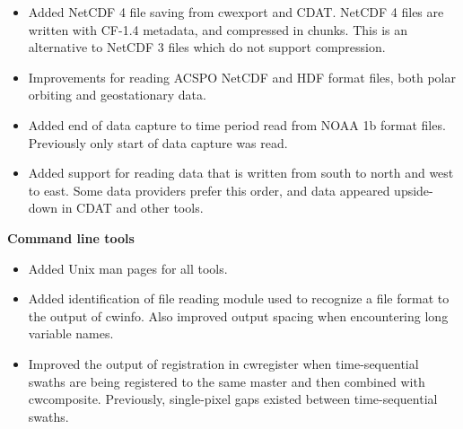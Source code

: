 \begin{itemize}

  \item Added NetCDF 4 file saving from cwexport and CDAT.  NetCDF 4 files are
  written with CF-1.4 metadata, and compressed in chunks.  This is an
  alternative to NetCDF 3 files which do not support compression.

  \item Improvements for reading ACSPO NetCDF and HDF format files, both
  polar orbiting and geostationary data.

  \item Added end of data capture to time period read from NOAA 1b format
  files.  Previously only start of data capture was read.

  \item Added support for reading data that is written from south to north
  and west to east.  Some data providers prefer this order, and data appeared
  upside-down in CDAT and other tools.

\end{itemize}

\hspace{0.4cm} {\bf Command line tools}

\begin{itemize}

  \item Added Unix man pages for all tools.

  \item Added identification of file reading module used to recognize a file
  format to the output of cwinfo.  Also improved output spacing when
  encountering long variable names.

  \item Improved the output of registration in cwregister when time-sequential
  swaths are being registered to the same master and then combined with
  cwcomposite.  Previously, single-pixel gaps existed between time-sequential
  swaths.

\end{itemize}

